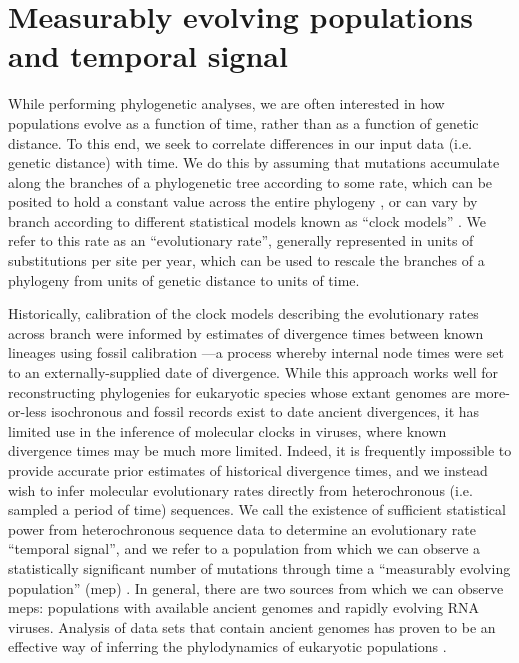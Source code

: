 \section{Measurably evolving populations and temporal signal}

While performing phylogenetic analyses, we are often interested in how populations evolve as a function of time, rather than as a function of genetic distance.
To this end, we seek to correlate differences in our input data (i.e. genetic distance) with time.
We do this by assuming that mutations accumulate along the branches of a phylogenetic tree according to some rate, which can be posited to hold a constant value across the entire phylogeny \cite{brown2011rate}, or can vary by branch according to different statistical models known as ``clock models'' \cite{drummond2006relaxed, drummond2010randomLocal}.
We refer to this rate as an ``evolutionary rate'', generally represented in units of substitutions per site per year, which can be used to rescale the branches of a phylogeny from units of genetic distance to units of time.

Historically, calibration of the clock models describing the evolutionary rates across branch were informed by estimates of divergence times between known lineages using fossil calibration \cite{pauling1963chemical, zuckerkandl1965molecules, near2005turtles}---a process whereby internal node times were set to an externally-supplied date of divergence.
While this approach works well for reconstructing phylogenies for eukaryotic species whose extant genomes are more-or-less isochronous and fossil records exist to date ancient divergences, it has limited use in the inference of molecular clocks in viruses, where known divergence times may be much more limited.
Indeed, it is frequently impossible to provide accurate prior estimates of historical divergence times, and we instead wish to infer molecular evolutionary rates directly from heterochronous (i.e. sampled a period of time) sequences.
We call the existence of sufficient statistical power from heterochronous sequence data to determine an evolutionary rate ``temporal signal'', and we refer to a population from which we can observe a statistically significant number of mutations through time a ``measurably evolving population'' (\gls{mep}) \cite{drummond2003measurably}.
In general, there are two sources from which we can observe \gls{mep}s: populations with available ancient genomes and rapidly evolving RNA viruses.
Analysis of data sets that contain ancient genomes has proven to be an effective way of inferring the phylodynamics of eukaryotic populations \cite{shapiro2004bison}. %

